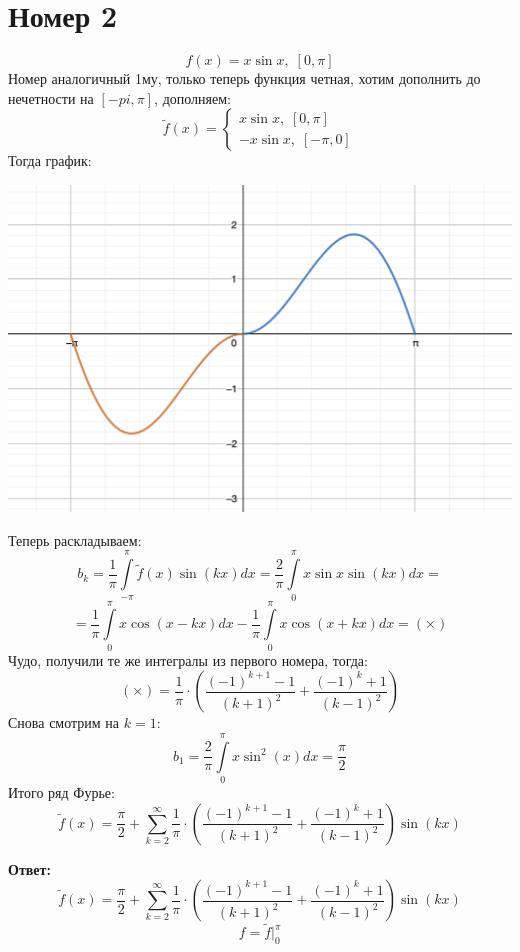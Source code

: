 \documentclass[a4paper,12pt]{article}
\begin{document}
\section*{Номер 2}
\[
f(x) = x \sin x, \; [0, \pi] 
\]
Номер аналогичный 1му, только теперь функция четная, хотим дополнить до нечетности на $[-pi, \pi]$, дополняем:
\[
\tilde{f}(x) = 
\begin{cases}
x \sin x, \; [0, \pi ] \\ 
-x \sin x, \; [-\pi, 0] 
\end{cases}
\]
Тогда график:
\begin{center}
\includegraphics[scale=0.3]{2.png}
\end{center}
Теперь раскладываем:
\[
b_k = \frac{1}{\pi} \int\limits_{-\pi}^{\pi} \tilde{f}(x) \sin (kx) dx = \frac{2}{\pi} \int\limits_{0}^{\pi} x \sin x \sin (kx) dx = 
\]
\[
=
\frac{1}{\pi} \int\limits_0^{\pi} x \cos (x - kx) dx - \frac{1}{\pi} \int\limits_0^{\pi} x \cos (x+ kx) dx = (\times) 
\]
Чудо, получили те же интегралы из первого номера, тогда:
\[
(\times) = \frac{1}{\pi} \cdot \left(\frac{(-1)^{k+1} - 1}{(k+1)^2} + \frac{(-1)^{k} + 1}{(k-1)^2}
\right)
\]
Снова смотрим на $k = 1$:
\[
b_1 = \frac{2}{\pi} \int\limits_0^{\pi} x \sin^2 (x) dx = \frac{\pi}{2}
\]
Итого ряд Фурье:
\[
\tilde{f} (x) = \frac{\pi}{2} + \sum_{k = 2}^{\infty}  \frac{1}{\pi} \cdot \left(\frac{(-1)^{k+1} - 1}{(k+1)^2} + \frac{(-1)^{k} + 1}{(k-1)^2}
\right) \sin(kx) 
\]

\begin{center}
\textbf{Ответ: } 
\[
\tilde{f} (x) = \frac{\pi}{2} + \sum_{k = 2}^{\infty}  \frac{1}{\pi} \cdot \left(\frac{(-1)^{k+1} - 1}{(k+1)^2} + \frac{(-1)^{k} + 1}{(k-1)^2}
\right) \sin(kx) 
\]
\[
f = \tilde{f} \Bigg|_0^{\pi}
\]
\end{center}
\clearpage
\end{document}
